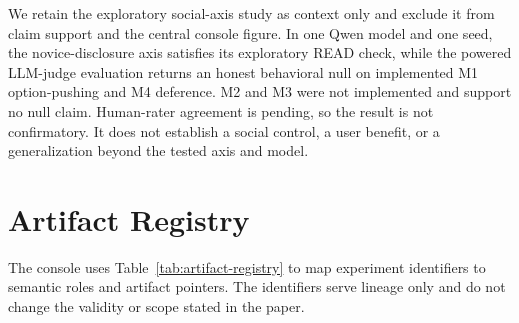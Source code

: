 \documentclass[sigconf]{acmart}
\begin{document}
We retain the exploratory social-axis study as context only and exclude it from claim support and the central console figure. In one Qwen model and one seed, the novice-disclosure axis satisfies its exploratory READ check, while the powered LLM-judge evaluation returns an honest behavioral null on implemented M1 option-pushing and M4 deference. M2 and M3 were not implemented and support no null claim. Human-rater agreement is pending, so the result is not confirmatory. It does not establish a social control, a user benefit, or a generalization beyond the tested axis and model.

\section{Artifact Registry}
\label{app:artifact-registry}

The console uses Table~\ref{tab:artifact-registry} to map experiment identifiers to semantic roles and artifact pointers. The identifiers serve lineage only and do not change the validity or scope stated in the paper.
\end{document}
